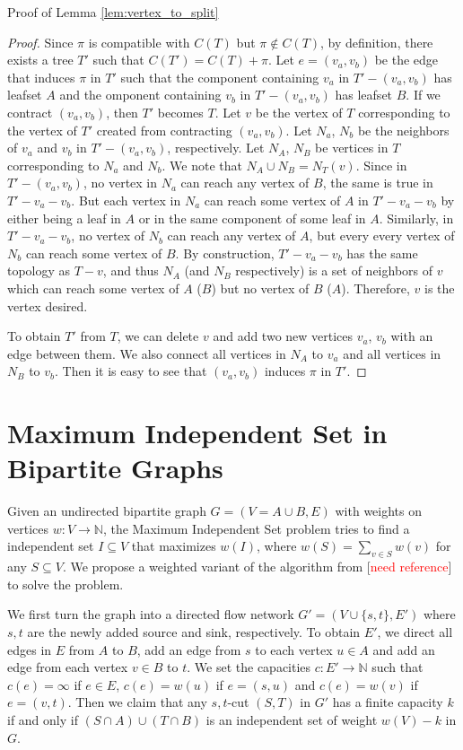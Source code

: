 \documentclass{bmcart}
\newcommand{\note}[1]{\textcolor{red}{#1}}
\begin{document}
Proof of Lemma \ref{lem:vertex_to_split}
\begin{proof}
Since $\pi$ is compatible with $C(T)$ but $\pi \notin C(T)$, by definition, there exists a tree $T'$ such that $C(T') = C(T) + \pi$. Let $e = (v_a,v_b)$ be the edge that induces $\pi$ in $T'$ such that the component containing $v_a$ in $T'-(v_a,v_b)$ has leafset $A$ and the omponent containing $v_b$ in $T'-(v_a,v_b)$ has leafset $B$. If we contract $(v_a,v_b)$, then $T'$ becomes $T$. Let $v$ be the vertex of $T$ corresponding to the vertex of $T'$ created from contracting $(v_a,v_b)$. Let $N_a$, $N_b$ be the neighbors of $v_a$ and $v_b$ in $T'-(v_a,v_b)$, respectively. Let $N_A$, $N_B$ be vertices in $T$ corresponding to $N_a$ and $N_b$. We note that $N_A \cup N_B = N_T(v)$. Since in $T' -(v_a,v_b)$, no vertex in $N_a$ can reach any vertex of $B$, the same is true in $T' - v_a - v_b$. But each vertex in $N_a$ can reach some vertex of $A$ in $T' - v_a - v_b$ by either being a leaf in $A$ or in the same component of some leaf in $A$. Similarly, in $T' - v_a - v_b$, no vertex of $N_b$ can reach any vertex of $A$, but every every vertex of $N_b$ can reach some vertex of $B$. By construction, $T' - v_a - v_b$ has the same topology as $T - v$, and thus $N_A$ (and $N_B$ respectively) is a set of neighbors of $v$ which can reach some vertex of $A$ ($B$) but no vertex of $B$ ($A$). Therefore, $v$ is the vertex desired. 

To obtain $T'$ from $T$, we can delete $v$ and add two new vertices $v_a$, $v_b$ with an edge between them. We also connect all vertices in $N_A$ to $v_a$ and all vertices in $N_B$ to $v_b$. Then it is easy to see that $(v_a,v_b)$ induces $\pi$ in $T'$. 
\end{proof}

\section{Maximum Independent Set in Bipartite Graphs}
Given an undirected bipartite graph $G= (V = A \cup B, E)$ with weights on vertices $w: V \to \mathbb{N}$, the Maximum Independent Set problem tries to find a independent set $I \subseteq V$ that maximizes $w(I)$, where $w(S) = \sum_{v\in S}w(v)$ for any $S \subseteq V$. We propose a weighted variant of the algorithm from [\note{need reference}] to solve the problem. \smallskip

We first turn the graph into a directed flow network $G' = (V \cup \{s,t\}, E')$ where $s, t$ are the newly added source and sink, respectively. To obtain $E'$, we direct all edges in $E$ from $A$ to $B$, add an edge from $s$ to each vertex $u \in A$ and add an edge from each vertex $v \in B$ to $t$. We set the capacities $c: E' \to \mathbb{N}$ such that $c(e) = \infty$ if $e \in E$, $c(e) = w(u)$ if $e = (s,u)$ and $c(e) = w(v)$ if $e = (v,t)$. Then we claim that any $s,t$-cut $(S,T)$ in $G'$ has a finite capacity $k$ if and only if $(S\cap A) \cup (T \cap B)$ is an independent set of weight $w(V) - k$ in $G$. \smallskip
\end{document}
